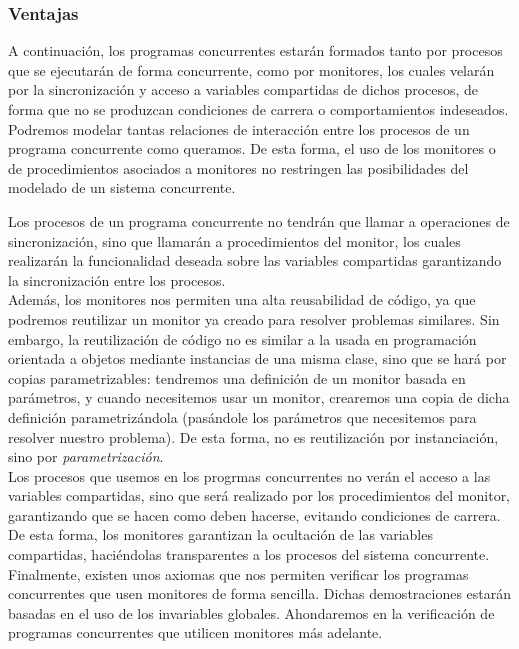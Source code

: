 \subsubsection{Ventajas}
A continuación, los programas concurrentes estarán formados tanto por procesos que se ejecutarán de forma concurrente, como por monitores, los cuales velarán por la sincronización y acceso a variables compartidas de dichos procesos, de forma que no se produzcan condiciones de carrera o comportamientos indeseados. Podremos modelar tantas relaciones de interacción entre los procesos de un programa concurrente como queramos. De esta forma, el uso de los monitores o de procedimientos asociados a monitores no restringen las posibilidades del modelado de un sistema concurrente. 

Los procesos de un programa concurrente no tendrán que llamar a operaciones de sincronización, sino que llamarán a procedimientos del monitor, los cuales realizarán la funcionalidad deseada sobre las variables compartidas garantizando la sincronización entre los procesos.\\

Además, los monitores nos permiten una alta reusabilidad de código, ya que podremos reutilizar un monitor ya creado para resolver problemas similares. Sin embargo, la reutilización de código no es similar a la usada en programación orientada a objetos mediante instancias de una misma clase, sino que se hará por copias parametrizables: tendremos una definición de un monitor basada en parámetros, y cuando necesitemos usar un monitor, crearemos una copia de dicha definición parametrizándola (pasándole los parámetros que necesitemos para resolver nuestro problema). De esta forma, no es reutilización por instanciación, sino por \textit{parametrización}.\\

Los procesos que usemos en los progrmas concurrentes no verán el acceso a las variables compartidas, sino que será realizado por los procedimientos del monitor, garantizando que se hacen como deben hacerse, evitando condiciones de carrera. De esta forma, los monitores garantizan la ocultación de las variables compartidas, haciéndolas transparentes a los procesos del sistema concurrente.\\

Finalmente, existen unos axiomas que nos permiten verificar los programas concurrentes que usen monitores de forma sencilla. Dichas demostraciones estarán basadas en el uso de los invariables globales. Ahondaremos en la verificación de programas concurrentes que utilicen monitores más adelante.

